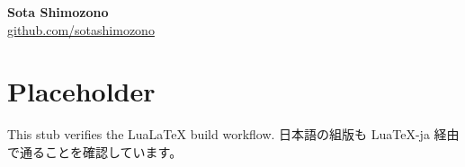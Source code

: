 \documentclass[a4paper,11pt]{article}
\begin{document}
\begin{center}
  {\LARGE\bfseries Sota Shimozono}\\[2mm]
  \href{https://github.com/sotashimozono}{github.com/sotashimozono}
\end{center}

\section*{Placeholder}

This stub verifies the LuaLaTeX build workflow.
日本語の組版も LuaTeX-ja 経由で通ることを確認しています。
\end{document}
